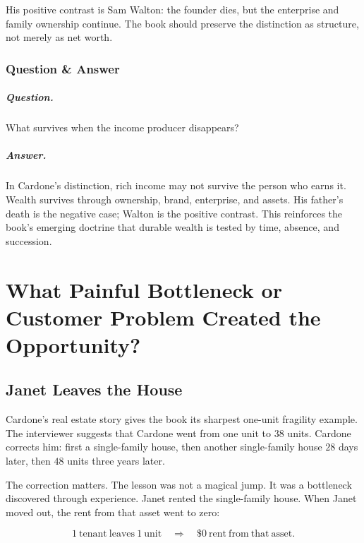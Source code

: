 \documentclass[11pt,oneside]{book}
\begin{document}
His positive contrast is Sam Walton: the founder dies, but the enterprise and family ownership continue. The book should preserve the distinction as structure, not merely as net worth.

\subsection{Question \& Answer}

\paragraph{Question.}
What survives when the income producer disappears?

\paragraph{Answer.}
In Cardone's distinction, rich income may not survive the person who earns it. Wealth survives through ownership, brand, enterprise, and assets. His father's death is the negative case; Walton is the positive contrast. This reinforces the book's emerging doctrine that durable wealth is tested by time, absence, and succession.

\chapter{What Painful Bottleneck or Customer Problem Created the Opportunity?}

\section{Janet Leaves the House}

Cardone's real estate story gives the book its sharpest one-unit fragility example. The interviewer suggests that Cardone went from one unit to \(38\) units. Cardone corrects him: first a single-family house, then another single-family house \(28\) days later, then \(48\) units three years later.

The correction matters. The lesson was not a magical jump. It was a bottleneck discovered through experience. Janet rented the single-family house. When Janet moved out, the rent from that asset went to zero:

\begin{equation}
1\ \mathrm{tenant\ leaves}\ 1\ \mathrm{unit}
\quad\Longrightarrow\quad
\$0\ \mathrm{rent\ from\ that\ asset}.
\end{equation}
\end{document}
